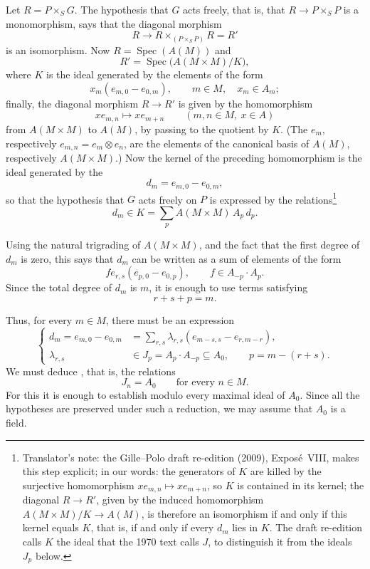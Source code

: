 Let \(R=P\times_SG\). The hypothesis that \(G\) acts freely, that is,
that \(R\to P\times_SP\) is a monomorphism, says that the diagonal
morphism
\[
  R\longrightarrow
  R\times_{(P\times_SP)}R=R'
\]
is an isomorphism. Now \(R=\operatorname{Spec}(A(M))\) and
\[
  R'=\operatorname{Spec}\bigl(A(M\times M)/K\bigr),
\]
where \(K\) is the ideal generated by the elements of the form
\[
  x_m(e_{m,0}-e_{0,m}),
  \qquad m\in M,\quad x_m\in A_m;
\]
finally, the diagonal morphism \(R\to R'\) is given by the homomorphism
\[
  x e_{m,n}\longmapsto x e_{m+n}
  \qquad (m,n\in M,\ x\in A)
\]
from \(A(M\times M)\) to \(A(M)\), by passing to the quotient by \(K\).
(The \(e_m\), respectively \(e_{m,n}=e_m\otimes e_n\), are the elements of
the canonical basis of \(A(M)\), respectively \(A(M\times M)\).) Now the
kernel of the preceding homomorphism is the ideal generated by the
\[
  d_m=e_{m,0}-e_{0,m},
\]
so that the hypothesis that \(G\) acts freely on \(P\) is expressed by the
relations\footnote{Translator's note: the Gille--Polo draft re-edition (2009), Expos\'e~VIII, makes
this step explicit; in our words: the generators of \(K\) are killed by the surjective homomorphism
\(x e_{m,n}\mapsto x e_{m+n}\), so \(K\) is contained in its kernel; the diagonal \(R\to R'\), given
by the induced homomorphism \(A(M\times M)/K\to A(M)\), is therefore an isomorphism if and only if
this kernel equals \(K\), that is, if and only if every \(d_m\) lies in \(K\). The draft re-edition
calls \(K\) the ideal that the 1970 text calls \(J\), to distinguish it from the ideals \(J_p\)
below.}
\[
  d_m\in K=\sum_p A(M\times M)\,A_p\,d_p.
  \tag{xx}\label{sga3:viii:theorem:5:1:eq:xx:01}
\]

Using the natural trigrading of \(A(M\times M)\), and the fact that the
first degree of \(d_m\) is zero, this says that \(d_m\) can be written as
a sum of elements of the form
\[
  f e_{r,s}(e_{p,0}-e_{0,p}),
  \qquad f\in A_{-p}\cdot A_p.
\]
Since the total degree of \(d_m\) is \(m\), it is enough to use terms
satisfying
\[
  r+s+p=m.
\]

Thus, for every \(m\in M\), there must be an expression
\[
  \left\{
  \begin{aligned}
    d_m=e_{m,0}-e_{0,m}
      &=\sum_{r,s}\lambda_{r,s}
        (e_{m-s,s}-e_{r,m-r}),\\
    \lambda_{r,s}&\in J_p=A_p\cdot A_{-p}\subseteq A_0,
      \qquad p=m-(r+s).
  \end{aligned}
  \right.
  \tag{xxx}\label{sga3:viii:theorem:5:1:eq:xxx:01}
\]
We must deduce , that is,
the relations
\[
  J_n=A_0
  \qquad\text{for every \(n\in M\).}
  \tag{xxxx}\label{sga3:viii:theorem:5:1:eq:xxxx:01}
\]
For this it is enough to establish  modulo every
maximal ideal of \(A_0\). Since all the hypotheses are preserved under
such a reduction, we may assume that \(A_0\) is a field.

